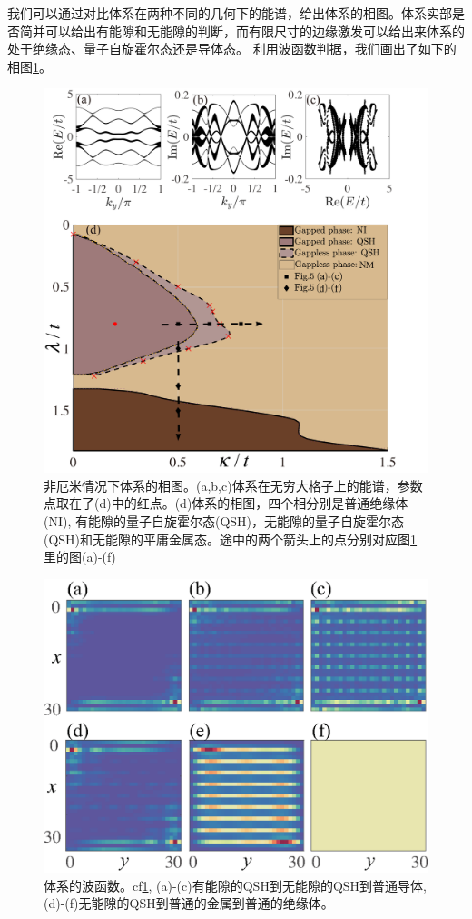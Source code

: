 \documentclass[supercite]{HustGraduPaper}
\begin{document}
   	我们可以通过对比体系在两种不同的几何下的能谱，给出体系的相图。体系实部是否简并可以给出有能隙和无能隙的判断，而有限尺寸的边缘激发可以给出来体系的处于绝缘态、量子自旋霍尔态还是导体态。
   	利用波函数判据，我们画出了如下的相图\ref{fig:fig4}。
   	\begin{figure}
   		\centering
   		\includegraphics[width=0.7\linewidth]{Figures/topoinsu/fig4}
   		\caption{非厄米情况下体系的相图。(a,b,c)体系在无穷大格子上的能谱，参数点取在了(d)中的红点。(d)体系的相图，四个相分别是普通绝缘体(NI), 有能隙的量子自旋霍尔态(QSH)，无能隙的量子自旋霍尔态(QSH)和无能隙的平庸金属态。途中的两个箭头上的点分别对应图\ref{fig:fig4}里的图(a)-(f)}
   		\label{fig:fig4}
   	\end{figure}
   	
   	\begin{figure}
   		\centering
   		\includegraphics[width=1\linewidth]{Figures/topoinsu/fig5}
   		\caption{体系的波函数。cf\ref{fig:fig4}, (a)-(c)有能隙的QSH到无能隙的QSH到普通导体,(d)-(f)无能隙的QSH到普通的金属到普通的绝缘体。}
   		\label{fig:fig5}
   	\end{figure}
   
\end{document}
